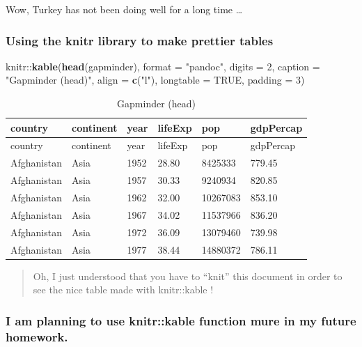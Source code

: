 \documentclass[]{article}
\newenvironment{Shaded}{\begin{snugshade}}{\end{snugshade}}
\newcommand{\KeywordTok}[1]{\textcolor[rgb]{0.13,0.29,0.53}{\textbf{{#1}}}}
\newcommand{\DataTypeTok}[1]{\textcolor[rgb]{0.13,0.29,0.53}{{#1}}}
\newcommand{\DecValTok}[1]{\textcolor[rgb]{0.00,0.00,0.81}{{#1}}}
\newcommand{\StringTok}[1]{\textcolor[rgb]{0.31,0.60,0.02}{{#1}}}
\newcommand{\OtherTok}[1]{\textcolor[rgb]{0.56,0.35,0.01}{{#1}}}
\newcommand{\NormalTok}[1]{{#1}}
\begin{document}
Wow, Turkey has not been doing well for a long time \ldots{}

\subsubsection{Using the knitr library to make prettier
tables}\label{using-the-knitr-library-to-make-prettier-tables}

\begin{Shaded}
\begin{Highlighting}[]
\NormalTok{knitr::}\KeywordTok{kable}\NormalTok{(}\KeywordTok{head}\NormalTok{(gapminder), }
             \DataTypeTok{format =} \StringTok{"pandoc"}\NormalTok{, }
             \DataTypeTok{digits =} \DecValTok{2}\NormalTok{,}
             \DataTypeTok{caption =} \StringTok{"Gapminder (head)"}\NormalTok{,}
             \DataTypeTok{align =} \KeywordTok{c}\NormalTok{(}\StringTok{"l"}\NormalTok{),}
             \DataTypeTok{longtable =} \OtherTok{TRUE}\NormalTok{,}
             \DataTypeTok{padding =} \DecValTok{3}\NormalTok{)}
\end{Highlighting}
\end{Shaded}

\begin{longtable}[]{@{}llllll@{}}
\caption{Gapminder (head)}\tabularnewline
\toprule
country & continent & year & lifeExp & pop & gdpPercap\tabularnewline
\midrule
\endfirsthead
\toprule
country & continent & year & lifeExp & pop & gdpPercap\tabularnewline
\midrule
\endhead
Afghanistan & Asia & 1952 & 28.80 & 8425333 & 779.45\tabularnewline
Afghanistan & Asia & 1957 & 30.33 & 9240934 & 820.85\tabularnewline
Afghanistan & Asia & 1962 & 32.00 & 10267083 & 853.10\tabularnewline
Afghanistan & Asia & 1967 & 34.02 & 11537966 & 836.20\tabularnewline
Afghanistan & Asia & 1972 & 36.09 & 13079460 & 739.98\tabularnewline
Afghanistan & Asia & 1977 & 38.44 & 14880372 & 786.11\tabularnewline
\bottomrule
\end{longtable}

\begin{quote}
Oh, I just understood that you have to ``knit'' this document in order
to see the nice table made with knitr::kable !
\end{quote}

\subsubsection{I am planning to use knitr::kable function mure in my
future
homework.}\label{i-am-planning-to-use-knitrkable-function-mure-in-my-future-homework.}
\end{document}
